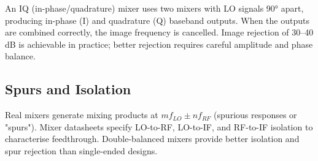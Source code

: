 				

An IQ (in-phase/quadrature) mixer uses two mixers with LO signals 90° apart, producing in-phase (I) and quadrature (Q) baseband outputs. When the outputs are combined correctly, the image frequency is cancelled. Image rejection of 30–40 dB is achievable in practice; better rejection requires careful amplitude and phase balance.

				

\subsection{Spurs and Isolation}

				

Real mixers generate mixing products at $mf_{LO} \pm nf_{RF}$ (spurious responses or "spurs"). Mixer datasheets specify LO-to-RF, LO-to-IF, and RF-to-IF isolation to characterise feedthrough. Double-balanced mixers provide better isolation and spur rejection than single-ended designs.



